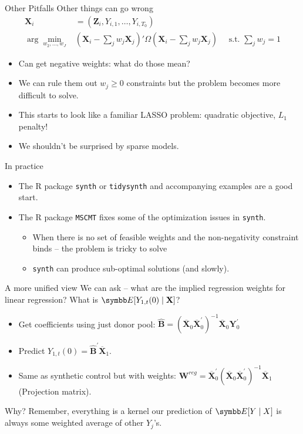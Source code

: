 \documentclass[aspectratio=169,11pt]{beamer}
\begin{document}
\begin{frame}{Other Pitfalls}
Other things can go wrong
\begin{align*}
\mathbf{X}_{i}&=\left(\mathbf{Z}_{i}, Y_{i,1},\ldots, Y_{i,T_0} \right)\\
\arg \min_{w_2,\ldots, w_J}&  (\mathbf{X}_{i}-\sum_j w_j \mathbf{X}_{j})' \Omega  (\mathbf{X}_{i}-\sum_j w_j \mathbf{X}_{j}) \quad \text{ s.t. }  \sum_j w_j =1
\end{align*}

\begin{itemize}
\item Can get negative weights: what do those mean? 
\item We can rule them out $w_j \geq 0$ constraints but the problem becomes more difficult to solve.
\item This starts to look like a familiar LASSO problem: quadratic objective, $L_1$ penalty!
\item We shouldn't be surprised by sparse models.
\end{itemize}
\end{frame}

\begin{frame}{In practice}
\begin{itemize}
\item The R package \texttt{synth} or \texttt{tidysynth} and accompanying examples are a good start.
\item The R package \texttt{MSCMT} fixes some of the optimization issues in \texttt{synth}.
\begin{itemize}
\item When there is no set of feasible weights and the non-negativity constraint binds -- the problem is tricky to solve
\item \texttt{synth} can produce sub-optimal solutions (and slowly).
\end{itemize}

\end{itemize}

\end{frame}


\begin{frame}{A more unified view}
We can ask -- what are the implied regression weights for linear regression? What is $\E[Y_{1,t}(0) \mid \mathbf{X}]$?
\begin{itemize}
\item Get coefficients using just donor pool: $\widehat{\boldsymbol{B}}=\left(\overline{\boldsymbol{X}}_{0} \overline{\boldsymbol{X}}_{0}^{\prime}\right)^{-1} \overline{\boldsymbol{X}}_{0} \boldsymbol{Y}_{0}^{\prime}$
\item Predict $Y_{1,t}(0) = \widehat{\boldsymbol{B}}^{\prime} \overline{\boldsymbol{X}}_{1}$.
\item Same as synthetic control but with weights: $\boldsymbol{W}^{r e g}=\overline{\boldsymbol{X}}_{0}^{\prime}\left(\overline{\boldsymbol{X}}_{0} \overline{\boldsymbol{X}}_{0}^{\prime}\right)^{-1} \overline{\boldsymbol{X}}_{1}$ (Projection matrix).
\end{itemize}
Why? Remember, \alert{everything is a kernel} our prediction of $\E[Y \mid X]$ is always some weighted average of other $Y_j$'s.
\end{frame}
\end{document}
